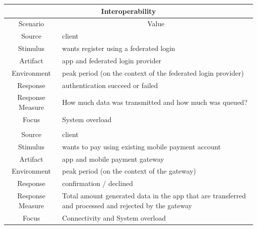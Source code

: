 \begin{table}[H]
    \begin{tabularx}{\textwidth}{|c|X|}
        \hline
        \multicolumn{2}{c}{\textbf{Interoperability}} \\
        \hline
        \toprule
        \multicolumn{1}{c}{Scenario} & \multicolumn{1}{c}{Value} \\
        \midrule
        Source & \gls{client} \\
        Stimulus & wants register using a \gls{federated login} \\
        Artifact & app and \gls{federated login} provider  \\
        Environment & peak period (on the context of the \gls{federated login} provider)\\
        Response & authentication succeed or failed\\
        Response Measure & How much data was transmitted and how much was queued? \\
        Focus & System overload \cite{refart:MKMS} \\
        & \\
        Source & \gls{client} \\
        Stimulus & wants to pay using existing mobile payment account \\
        Artifact & app and \gls{mobile payment gateway}  \\
        Environment & peak period (on the context of the gateway)\\
        Response & confirmation / declined \\
        Response Measure & Total amount generated data in the app that are transferred and processed and rejected
        by the gateway \\
        Focus & Connectivity and System overload \cite{refart:MKMS} \\
        \bottomrule
    \end{tabularx}
\end{table}

